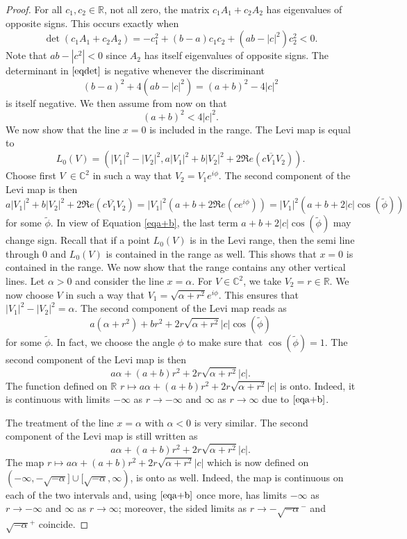 \documentclass[10pt,a4paper]{amsart}
\newcommand{\C}{\mathbb C}
\newcommand{\R}{\mathbb R}
\numberwithin{equation}{section}
\begin{document}
\begin{proof}
For all $c_1,c_2 \in \R$, not all zero,  the matrix $c_1A_1+c_2A_2$ has eigenvalues of opposite signs. This occurs exactly when 
\begin{equation}\label{eqdet}
\det (c_1A_1+c_2A_2)=-c_1^2+(b-a)c_1c_2+(ab-|c|^2)c_2^2 < 0.
\end{equation}
Note that $ab-|c^2|<0$ since $A_2$ has itself eigenvalues of opposite signs. The determinant in $\eqref{eqdet}$ is negative whenever the discriminant
$$(b-a)^2+4(ab-|c|^2)=(a+b)^2-4|c|^2$$
is itself negative. We then assume from now on that 
\begin{equation}\label{eqa+b}
(a+b)^2<4|c|^2.
\end{equation}
We now show that the line $x=0$ is included in the range. 
The Levi map is equal to $$L_0(V)=\left(|V_1|^2-|V_2|^2,a|V_1|^2+b|V_2|^2+2\Re e (c\overline{V_1}V_2)\right).$$
Choose first $V \ \in \C^2$ in such a way that $V_2=V_1e^{i\phi}$. The second component of the Levi map is then 
$$a|V_1|^2+b|V_2|^2+2\Re e (c\overline{V_1}V_2)=|V_1|^2\left(a+b+2\Re e (ce^{i\phi})\right)=|V_1|^2\left(a+b+2|c|\cos (\tilde{\phi})\right)$$
for some $\tilde{\phi}$. 
In view of Equation \eqref{eqa+b}, the last term $a+b+2|c|\cos (\tilde{\phi})$ may change sign. Recall that if a point $L_0(V)$ is in the Levi range, then the semi line through $0$ and $L_0(V)$  is contained in the range as well. This shows that   $x=0$ is contained in the range.   
 We now show that the range contains any other vertical lines. Let $\alpha>0$ and consider the line $x=\alpha$.  For $V \in \C^2$, we take $V_2=r \in \R$. We now choose $V$ in such a way that $V_1=\sqrt{\alpha+r^2}e^{i\phi}$. This ensures that $|V_1|^2-|V_2|^2=\alpha$.  
 The second component of the Levi map reads as
 $$a(\alpha+r^2)+br^2+2r\sqrt{\alpha+r^2}|c|\cos(\tilde{\phi})$$
 for some  $\tilde{\phi}$. In fact, we choose the angle $\phi$ to make sure that $\cos(\tilde{\phi})=1$. The second component of the Levi map is then 
 $$a\alpha+(a+b)r^2+2r\sqrt{\alpha+r^2}|c|.$$
The function  defined on $\R$ $r \mapsto a\alpha+(a+b)r^2+2r\sqrt{\alpha+r^2}|c|$ is onto. Indeed, it is continuous with limits $-\infty$ as $r \to -\infty$ and $\infty$ as $r\to \infty$ due to  $\eqref{eqa+b}$. 

            
 
The treatment of the  line $x=\alpha$ with  $\alpha<0$ is very similar.  The second component of the Levi map is still written as 
 $$a\alpha+(a+b)r^2+2r\sqrt{\alpha+r^2}|c|.$$
 The map $r \mapsto a\alpha+(a+b)r^2+2r\sqrt{\alpha+r^2}|c|$ which is now defined on $(-\infty,-\sqrt{-\alpha}] \cup [\sqrt{-\alpha},\infty)$, is onto as well. Indeed, the map is continuous on each of the two intervals and, using $\eqref{eqa+b}$ once more, has limits $-\infty$ as $r\to -\infty$ and  $\infty$ as $r\to \infty$; moreover, the sided limits as $r \to -\sqrt{-\alpha}^-$ and $\sqrt{-\alpha}^+$ coincide.  
 \end{proof}
\end{document}
